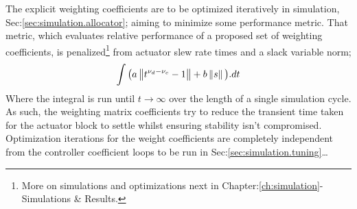 {\par
The explicit weighting coefficients are to be optimized iteratively in simulation, Sec:\ref{sec:simulation.allocator}; aiming to minimize some performance metric. That metric, which evaluates relative performance of a proposed set of weighting coefficients, is penalized\footnote{More on simulations and optimizations next in Chapter:\ref{ch:simulation}-Simulations \& Results.} from actuator slew rate times and a slack variable norm;
\begin{equation}\label{eq:actuator-penalty}
\int \big(a\left\lVert t^{\nu_d-\nu_c}-1\right\rVert+b\left\lVert s\right\rVert\big).dt
\end{equation}
Where the integral is run until $t\rightarrow\infty$ over the length of a single simulation cycle. As such, the weighting matrix coefficients try to reduce the transient time taken for the actuator block to settle whilst ensuring stability isn't compromised. Optimization iterations for the weight coefficients are completely independent from the controller coefficient loops to be run in Sec:\ref{sec:simulation.tuning}\ldots
}
